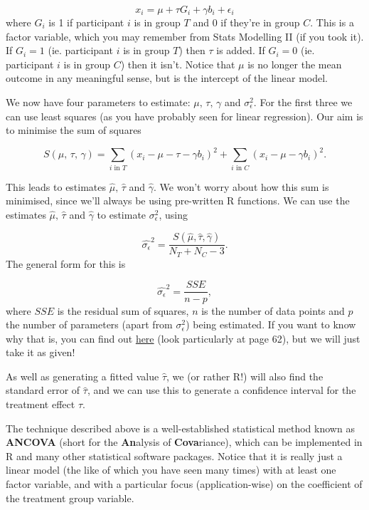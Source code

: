 \documentclass[
  openany]{book}
\theoremstyle{definition}
\theoremstyle{definition}
\theoremstyle{definition}
\theoremstyle{definition}
\theoremstyle{remark}
\begin{document}
\[ x_i = \mu + \tau G_i+ \gamma b_i + \epsilon_i \]
where \(G_i\) is 1 if participant \(i\) is in group \(T\) and 0 if they're in group \(C\). This is a factor variable, which you may remember from Stats Modelling II (if you took it). If \(G_i=1\) (ie. participant \(i\) is in group \(T\)) then \(\tau\) is added. If \(G_i=0\) (ie. participant \(i\) is in group \(C\)) then it isn't. Notice that \(\mu\) is no longer the mean outcome in any meaningful sense, but is the intercept of the linear model.

We now have four parameters to estimate: \(\mu,\,\tau,\,\gamma\) and \(\sigma^2_\epsilon\). For the first three we can use least squares (as you have probably seen for linear regression). Our aim is to minimise the sum of squares

\[S\left(\mu,\, \tau,\,\gamma\right) = \sum\limits_{i\text{ in }T} \left(x_i - \mu - \tau - \gamma b_i\right)^2 + \sum\limits_{i\text{ in }C} \left(x_i - \mu - \gamma b_i\right)^2.\]

This leads to estimates \(\hat{\mu},\, \hat{\tau}\) and \(\hat{\gamma}\). We won't worry about how this sum is minimised, since we'll always be using pre-written R functions. We can use the estimates \(\hat{\mu},\, \hat{\tau}\) and \(\hat{\gamma}\) to estimate \(\sigma^2_\epsilon\), using

\[\hat{\sigma_\epsilon}^2 = \frac{S\left(\hat{\mu},\hat{\tau}, \hat{\gamma}\right)}{N_T + N_C -3}.\]
The general form for this is

\[ \hat{\sigma_\epsilon}^2 = \frac{SSE}{n-p},\]
where \(SSE\) is the residual sum of squares, \(n\) is the number of data points and \(p\) the number of parameters (apart from \(\sigma_\epsilon^2\)) being estimated. If you want to know why that is, you can find out \href{https://pages.stern.nyu.edu/~wgreene/MathStat/GreeneChapter4.pdf}{here} (look particularly at page 62), but we will just take it as given!

As well as generating a fitted value \(\hat{\tau}\), we (or rather R!) will also find the standard error of \(\hat\tau\), and we can use this to generate a confidence interval for the treatment effect \(\tau\).

The technique described above is a well-established statistical method known as \textbf{ANCOVA} (short for the \textbf{An}alysis of \textbf{Cova}riance), which can be implemented in R and many other statistical software packages. Notice that it is really just a linear model (the like of which you have seen many times) with at least one factor variable, and with a particular focus (application-wise) on the coefficient of the treatment group variable.
\end{document}
